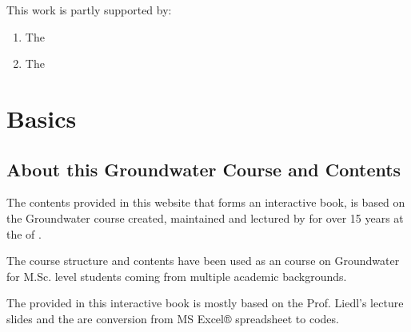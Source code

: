 \documentclass[letterpaper,10pt,english]{jupyterBook}
\begin{document}
\sphinxAtStartPar
This work is partly supported by:
\begin{enumerate}
%
\item {} 
\sphinxAtStartPar
The 

\item {} 
\sphinxAtStartPar
The 

\end{enumerate}

\sphinxstepscope


\part{Basics}

\sphinxstepscope


\chapter{About this Groundwater Course and Contents}
\label{\detokenize{content/background/00_general:about-this-groundwater-course-and-contents}}\label{\detokenize{content/background/00_general::doc}}
\sphinxAtStartPar
The contents provided in this website that forms an interactive book, is based on the Groundwater course created, maintained and lectured by
 for over 15 years at the  of .

\sphinxAtStartPar
The course structure and contents have been used as an  course on Groundwater for M.Sc. level students coming from multiple academic backgrounds.

\sphinxAtStartPar
The  provided in this interactive book is mostly based on the Prof. Liedl’s lecture slides and the  are conversion from MS Excel® spreadsheet to  codes.
\begin{quote}

\sphinxAtStartPar
{}
\end{quote}
\end{document}
